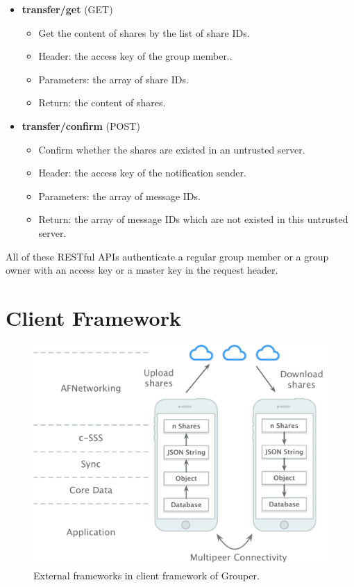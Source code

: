 \documentclass[a4paper,11pt]{report}
\begin{document}
\begin{itemize}[leftmargin=7mm]
\begin{itemize}
	\end{itemize}
	\item 
	\textbf{transfer/get} (GET)
	\begin{itemize}
		\item Get the content of shares by the list of share IDs.
		\item Header: the access key of the group member..
		\item Parameters: the array of share IDs.
		\item Return: the content of shares.
	\end{itemize}
	\item 
	\textbf{transfer/confirm} (POST)
	\begin{itemize}
		\item Confirm whether the shares are existed in an untrusted server. 
		\item Header: the access key of the notification sender.
		\item Parameters: the array of message IDs.
		\item Return: the array of message IDs which are not existed in this untrusted server.
	\end{itemize}
\end{itemize}

All of these RESTful APIs authenticate a regular group member or a group owner with an access key or a master key in the request header.

\section{Client Framework} \label{section:client_framework}

\begin{figure}
	\centering
	\includegraphics[scale=0.6]{frameworks}
	\caption{External frameworks in client framework of Grouper.}
	\label{fig:frameworks}
\end{figure}
\end{document}
